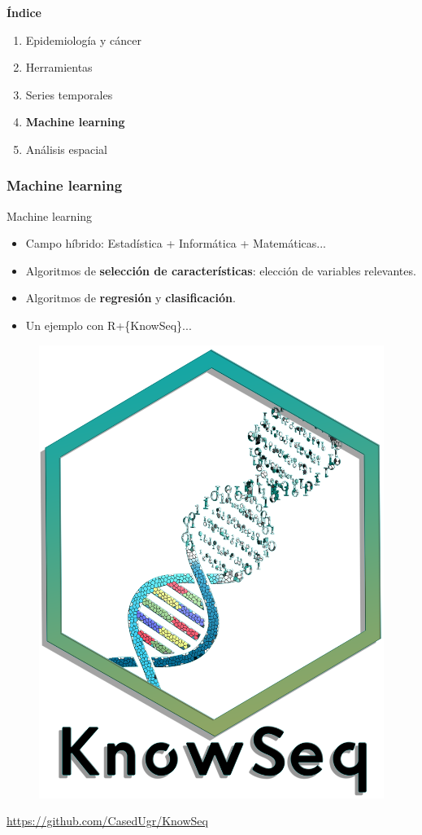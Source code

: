 \documentclass{beamer}
\begin{document}

\begin{frame}\frametitle{}
	\Large{\textbf{Índice}}\\[2ex]
	\normalsize
	\begin{enumerate}
		\item Epidemiología y cáncer\\[2ex]
		\item Herramientas\\[2ex]
		\item Series temporales \\[2ex]
		\item \textbf{Machine learning}  \\[2ex]
		\item Análisis espacial \\[2ex]
	\end{enumerate}
\end{frame}


\begin{frame}\frametitle{Machine learning}
	\begin{block}{Machine learning}
		\begin{itemize}
			\item Campo híbrido: Estadística + Informática + Matemáticas... \\[2ex]
			\item Algoritmos de \textbf{selección de características}: elección de variables relevantes.\\[2ex]
			\item Algoritmos de \textbf{regresión} y \textbf{clasificación}.\\[2ex]
			\item Un ejemplo con R+\{KnowSeq\}...
		\end{itemize}
		\begin{figure}
			\centering
			\includegraphics[width=.15\textwidth]{images/06_logo_knowseq.png}			
		\end{figure}
		\vspace{-10pt}
		\centering
		\url{https://github.com/CasedUgr/KnowSeq}
	\end{block}
\end{frame}
\end{document}
